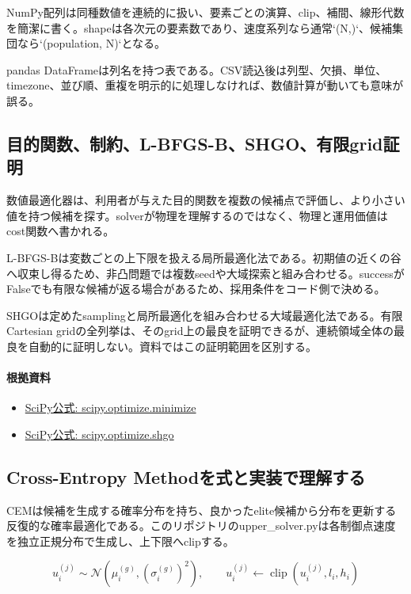 \documentclass[a4paper,11pt]{article}
\begin{document}
NumPy配列は同種数値を連続的に扱い、要素ごとの演算、clip、補間、線形代数を簡潔に書く。shapeは各次元の要素数であり、速度系列なら通常`(N,)`、候補集団なら`(population, N)`となる。


pandas DataFrameは列名を持つ表である。CSV読込後は列型、欠損、単位、timezone、並び順、重複を明示的に処理しなければ、数値計算が動いても意味が誤る。



\subsection{目的関数、制約、L-BFGS-B、SHGO、有限grid証明}
数値最適化器は、利用者が与えた目的関数を複数の候補点で評価し、より小さい値を持つ候補を探す。solverが物理を理解するのではなく、物理と運用価値はcost関数へ書かれる。


L-BFGS-Bは変数ごとの上下限を扱える局所最適化法である。初期値の近くの谷へ収束し得るため、非凸問題では複数seedや大域探索と組み合わせる。successがFalseでも有限な候補が返る場合があるため、採用条件をコード側で決める。


SHGOは定めたsamplingと局所最適化を組み合わせる大域最適化法である。有限Cartesian gridの全列挙は、そのgrid上の最良を証明できるが、連続領域全体の最良を自動的に証明しない。資料ではこの証明範囲を区別する。

\paragraph{根拠資料}
\begin{itemize}[leftmargin=1.6em]
\item \href{https://docs.scipy.org/doc/scipy/reference/generated/scipy.optimize.minimize.html}{SciPy公式: scipy.optimize.minimize}
\item \href{https://docs.scipy.org/doc/scipy/reference/generated/scipy.optimize.shgo.html}{SciPy公式: scipy.optimize.shgo}
\end{itemize}

\subsection{Cross-Entropy Methodを式と実装で理解する}
CEMは候補を生成する確率分布を持ち、良かったelite候補から分布を更新する反復的な確率最適化である。このリポジトリのupper\_solver.pyは各制御点速度を独立正規分布で生成し、上下限へclipする。


\[
u_i^{(j)} \sim \mathcal{N}(\mu_i^{(g)},(\sigma_i^{(g)})^2),\qquad u_i^{(j)}\leftarrow\operatorname{clip}(u_i^{(j)},l_i,h_i)
\]
\end{document}
